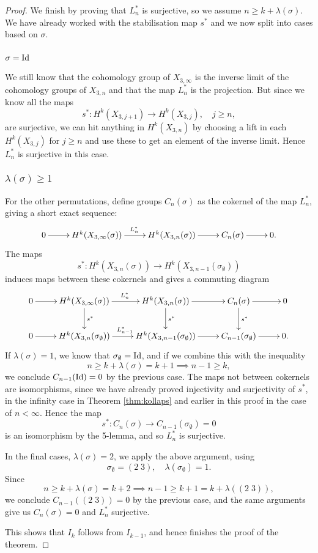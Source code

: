 \begin{proof}
  We finish by proving that $L_n^*$ is surjective, so we assume $n \geq
  k+\lambda(\sigma)$. We have already
  worked with the stabilisation map $s^*$ and we now split into cases
  based on $\sigma$.
  
  \subsubsection{$\sigma = \operatorname{Id}$}
  
  We still know that the cohomology group of $X_{3,\infty}$ is the
  inverse limit of the
  cohomology groups of $X_{3,n}$ and that the map $L_n^*$ is the
  projection. But since we know all the maps 
  \[s^* : H^k(X_{3,j+1})\to H^k(X_{3,j}), \quad j \geq n, \]
  are surjective, we can hit anything in $H^k(X_{3,n})$ by choosing a
  lift in each $H^k(X_{3,j})$ for $j \geq n$ and use these to get an
  element of the inverse limit. Hence $L_n^*$ is surjective in this
  case.
  
  \subsubsection{$\lambda(\sigma) \geq 1$}
  
  For the other permutations, define groups $C_n(\sigma)$ as the
  cokernel of the map $L_n^*$, giving a short exact sequence:
  \[ \xymatrix{ 0 \ar[r] & H^k(X_{3,\infty}(\sigma))
    \ar[r]^{L_{n}^*} &
    H^k(X_{3,n}(\sigma)) \ar[r] &
    C_{n}(\sigma) \ar[r] &  0.} \]
  The maps
  \[s^* : H^k(X_{3,n}(\sigma)) \to H^k(X_{3,n-1}(\sigma_{\emptyset})) \]
  induces maps between these cokernels and gives a commuting diagram
  \[ \xymatrix{ 0 \ar[r] & H^k(X_{3,\infty}(\sigma))
    \ar[r]^{L_{n}^*}\ar[d]^-{s^*} &
    H^k(X_{3,n}(\sigma)) \ar[r]\ar[d]^-{s^*} &
    C_{n}(\sigma) \ar[r]\ar[d]^-{s^*} &  0 \\
    0 \ar[r] & H^k(X_{3,n}(\sigma_{\emptyset})) \ar[r]^{L_{n-1}^*} &
    H^k(X_{3,n-1}(\sigma_{\emptyset})) \ar[r] &
    C_{n-1}(\sigma_{\emptyset}) \ar[r] &  0. } \]
  If $\lambda(\sigma) = 1$, we know that $\sigma_{\emptyset} = \operatorname{Id}$, and
  if we combine this with the inequality
  \[ n \geq k+\lambda(\sigma) = k+1 \implies n-1 \geq k, \]
  we conclude $C_{n-1}(\operatorname{Id}) = 0$ by the previous case. The
  maps not between cokernels are isomorphisms, since we have already
  proved
  injectivity and surjectivity of $s^*$, in the infinity case in
  Theorem \ref{thm:kollaps} and earlier in this proof in the case of $n
  < \infty$. Hence the map 
  \[ s^* : C_{n}(\sigma) \to C_{n-1}(\sigma_{\emptyset}) = 0 \]
  is an isomorphism by the 5-lemma, and so $L_n^*$ is surjective.
  
  In the final cases, $\lambda(\sigma) = 2$, we apply the above
  argument, using
  \[ \sigma_{\emptyset} = (2\; 3),\quad \lambda(\sigma_{\emptyset}) =
  1. \]
  Since
  \[ n \geq k+\lambda(\sigma) = k +2 \implies n-1 \geq k+1 = k +
  \lambda((2\;3)), \]
  we conclude $C_{n-1}((2\;3))=0$ by the previous case, and the same
  arguments give us $C_{n}(\sigma) = 0$ and $L^*_n$ surjective.
  
  This shows that $I_k$ follows from $I_{k-1}$, and hence finishes the
  proof of the theorem.
\end{proof}

